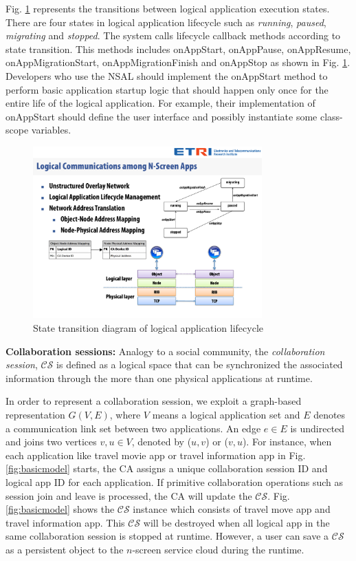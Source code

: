\documentclass[conference]{IEEEtran}
\begin{document}
Fig. \ref{fig:logicalapp} represents the transitions between logical application execution states. There are four states in logical application lifecycle such as \textit{running}, \textit{paused}, \textit{migrating} and \textit{stopped}. The system calls lifecycle callback methods according to state transition. This methods includes {\small \sffamily onAppStart, onAppPause, onAppResume, onAppMigrationStart, onAppMigrationFinish} and {\small \sffamily onAppStop} as shown in Fig. \ref{fig:logicalapp}.
Developers who use the NSAL should implement the {\small \sffamily onAppStart} method to perform basic application startup logic that should happen only once for the entire life of the logical application. For example, their implementation of {\small \sffamily onAppStart} should define the user interface and possibly instantiate some class-scope variables.
    \begin{figure}[htb] %
    \centering
    \includegraphics[width=8.8cm,keepaspectratio]{lifecycle}
    \caption{State transition diagram of logical application lifecycle}
    \label{fig:logicalapp}
    \end{figure}

\noindent
\textbf{Collaboration sessions: }
Analogy to a social community, the \textit{collaboration session}, $\mathcal{CS}$ is defined as a logical space  that can be synchronized the associated information through the more than one physical applications at runtime.

In order to represent a collaboration session, we exploit a graph-based representation $G(V, E)$, where $V$ means a logical application set and $E$ denotes a communication link set between two applications. An edge $e \in E$ is undirected and joins two vertices $v, u \in V$, denoted by ($u, v$) or ($v, u$). 
For instance, 
when each application like travel movie app or travel information app in Fig. \ref{fig:basicmodel} starts, the CA assigns a unique collaboration session ID and logical app ID for each application. If primitive collaboration operations such as session join and leave is processed, the CA will update the $\mathcal{CS}$. Fig. \ref{fig:basicmodel} shows the  $\mathcal{CS}$ instance which consists of travel move app and travel information app. This $\mathcal{CS}$ will be destroyed when all logical app in the same collaboration session is stopped at runtime. However, a user can save a $\mathcal{CS}$ as a persistent object to the $n$-screen service cloud during the runtime.\\
\end{document}
